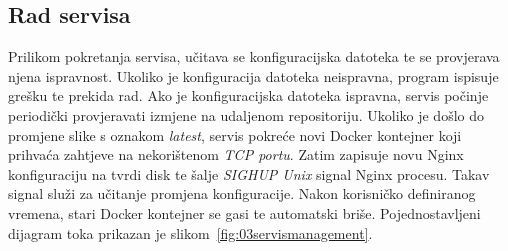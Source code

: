 \subsection{Rad servisa}
Prilikom pokretanja servisa, učitava se konfiguracijska datoteka te se provjerava njena ispravnost.
Ukoliko je konfiguracija datoteka neispravna, program ispisuje grešku te prekida rad. Ako je
konfiguracijska datoteka ispravna, servis počinje periodički provjeravati izmjene na udaljenom
repositoriju. Ukoliko je došlo do promjene slike s oznakom \textit{latest}, servis pokreće novi
Docker kontejner koji prihvaća zahtjeve na nekorištenom \textit{TCP portu}. Zatim zapisuje novu
Nginx konfiguraciju na tvrdi disk te šalje \textit{SIGHUP Unix} signal Nginx procesu. Takav signal
služi za učitanje promjena konfiguracije. Nakon korisničko definiranog vremena, stari Docker
kontejner se gasi te automatski briše. Pojednostavljeni dijagram toka prikazan je
slikom~\ref{fig:03servismanagement}.

